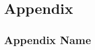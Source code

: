 \chapter{Appendix}
\label{chap:anexos}
\graphicspath{{Anexos/}{Anexos/}}


\section{Appendix Name}
\label{sec:appendix}

